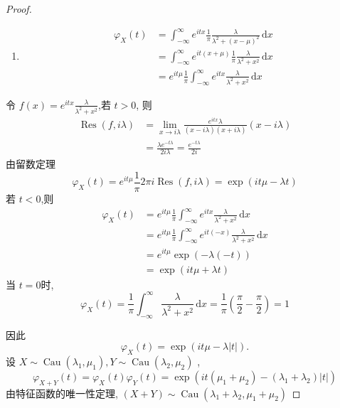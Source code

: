 \documentclass[../main.tex]{subfiles}
\begin{document}
\begin{proof}
\begin{enumerate}
    \item $$ \begin{aligned}  \varphi _{X}\left(t\right)&= \int_{-\infty}^{\infty}e^{itx}\frac{1 }{ \pi  }\frac{ \lambda  }{ \lambda ^{2}+ \left(x-\mu \right)^{2} }\,\mathrm{d} x\\&= \int_{-\infty}^{\infty}e^{it\left(x+ \mu \right)}\frac{1 }{ \pi  }\frac{ \lambda  }{ \lambda ^{2}+ x^{2} }\,\mathrm{d} x \\&= e^{it\mu }\frac{1 }{ \pi  }\int_{-\infty}^{\infty}e^{itx}\frac{ \lambda  }{ \lambda ^{2}+ x^{2} }\,\mathrm{d} x\end{aligned} $$ 
\end{enumerate}
令 $f\left(x\right)= e^{itx}\frac{ \lambda  }{ \lambda ^{2}+ x^{2} }$,若 $t> 0$, 则  
$$\begin{aligned}  \operatorname{Res}\left(f, i \lambda \right)&= \lim_{x\to i \lambda }\frac{e^{itx} \lambda }{\left(x-i \lambda \right)\left(x+ i \lambda \right)} \left(x-i \lambda \right)\\&=\frac{ \lambda e^{-t \lambda }}{2i \lambda }= \frac{e^{-t \lambda }}{2i}\end{aligned} $$
 由留数定理   
$$  \varphi _{X}\left(t\right)= e^{it\mu }\frac{1}{ \pi }2 \pi i\operatorname{Res}\left(f,i \lambda \right)= \exp \left(it\mu - \lambda t\right) $$ 
  若 $t< 0$,则  
 $$ \begin{aligned}  \varphi _{X}\left(t\right)&= e^{it\mu }\frac{1}{ \pi } \int_{-\infty}^{\infty}e^{itx}\frac{ \lambda }{ \lambda ^{2}+ x^{2}}\,\mathrm{d} x\\&= e^{it\mu }\frac{1}{ \pi }\int_{-\infty}^{\infty}e^{it\left(-x\right)}\frac{ \lambda }{ \lambda ^{2}+ x^{2}}\,\mathrm{d} x\\&= e^{it\mu }\exp \left(- \lambda \left(-t\right)\right)\\&= \exp \left(it\mu +  \lambda t\right) \end{aligned} $$
  当 $t= 0$时, 
$$  \varphi _{X}\left(t\right)= \frac{1 }{ \pi  }\int_{-\infty}^{\infty}\frac{ \lambda  }{ \lambda ^{2}+ x^{2} }\,\mathrm{d} x= \frac{1 }{ \pi  } \left(\frac{ \pi  }{2 }-\frac{ \pi  }{2 }\right)= 1 $$
 
因此 
 $$  \varphi _{X}\left(t\right)= \exp \left(it\mu - \lambda \left| t \right| \right). $$ 
  设 $X\sim \operatorname{Cau}\left( \lambda _1 ,\mu _1 \right), Y\sim \operatorname{Cau}\left( \lambda _2 ,\mu _2 \right)$ ,  
 $$  \varphi _{X+ Y}\left(t\right)=  \varphi _{X}\left(t\right) \varphi _{Y}\left(t\right)= \exp \left(it\left(\mu _1 + \mu _2 \right)- \left( \lambda _1 +  \lambda _2 \right)\left| t \right| \right) $$
 由特征函数的唯一性定理, $\left(X+ Y\right)\sim \operatorname{Cau}\left( \lambda _1 +  \lambda _2 ,\mu _1 + \mu _2 \right)$


\end{proof}
\end{document}
